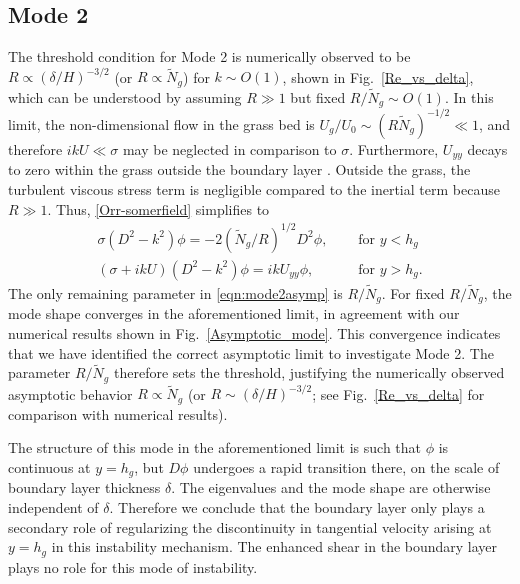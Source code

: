 \documentclass{jfm}
\newcommand{\hg}{h_g}
\renewcommand{\Rey}{{R}}
\newcommand{\Ndg}{\tilde{N}_g}
\begin{document}
\subsection{Mode 2}
The threshold condition for Mode 2 is numerically observed to be $\Rey \propto ({\delta}/{H})^{-3/2}$ (or $\Rey \propto \Ndg$) for $k\sim O(1)$, shown in Fig.~\ref{Re_vs_delta}, which can be understood by assuming $\Rey \gg 1$ but fixed $\Rey/\Ndg \sim O(1)$.
In this limit, the non-dimensional flow in the grass bed is $U_g/U_0 \sim (\Rey \Ndg)^{-1/2} \ll 1$, and therefore $ikU \ll \sigma$ may be neglected in comparison to $\sigma$. 
Furthermore, $U_{yy}$ decays to zero within the grass outside the boundary layer . 
Outside the grass, the turbulent viscous stress term is negligible compared to the inertial term because $\Rey \gg 1$. 
Thus, \eqref{Orr-somerfield} simplifies to 
\begin{subequations}
\begin{align}
\sigma\left(D^2-k^2\right)\phi = -2{(\Ndg/\Rey)^{1/2}}D^2\phi,  \quad &\text{ for } y<\hg  \label{eqn:mode2asympa} \\
\left(\sigma+ikU\right) \left(D^2-k^2\right)\phi =  ikU_{yy}\phi, \quad &\text{ for } y>\hg. \label{eqn:mode2asympb}
\end{align}
\label{eqn:mode2asymp}
\end{subequations}
The only remaining parameter in \eqref{eqn:mode2asymp} is $\Rey/\Ndg$. 
For fixed $\Rey/\Ndg$, the mode shape converges in the aforementioned limit, in agreement with our numerical results shown in Fig.~\ref{Asymptotic_mode}.
This convergence indicates that we have identified the correct asymptotic limit to investigate Mode 2.
The parameter $\Rey/\Ndg$ therefore sets the threshold, justifying the numerically observed asymptotic behavior $\Rey \propto \Ndg$ (or $\Rey \sim ({\delta}/{H})^{-3/2}$; see Fig.~\ref{Re_vs_delta} for comparison with numerical results).

The structure of this mode in the aforementioned limit is such that $\phi$ is continuous at $y=h_g$, but $D\phi$ undergoes a rapid transition there, on the scale of boundary layer thickness $\delta$.
The eigenvalues and the mode shape are otherwise independent of $\delta$.
Therefore we conclude that the boundary layer only plays a secondary role of regularizing the discontinuity in tangential velocity arising at $y=\hg$ in this instability mechanism.
The enhanced shear in the boundary layer plays no role for this mode of instability.
\end{document}
